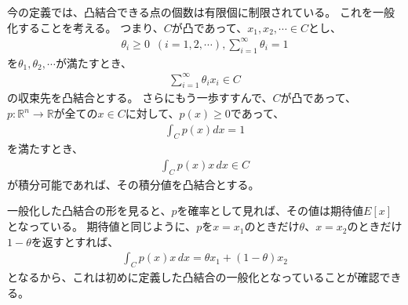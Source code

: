 \documentclass[pdflatex, ja=standard, a4paper]{bxjsarticle}
\begin{document}
今の定義では、凸結合できる点の個数は有限個に制限されている。
これを一般化することを考える。
つまり、$C$が凸であって、$x_1, x_2, \cdots \in C$とし、
\begin{align*}
    \theta_i \geq 0 \enspace (i = 1, 2, \cdots), \sum_{i = 1}^\infty \theta_i = 1
\end{align*}
を$\theta_1, \theta_2, \cdots$が満たすとき、
\begin{align*}
    \sum_{i = 1}^\infty \theta_i x_i \in C
\end{align*}
の収束先を凸結合とする。
さらにもう一歩すすんで、$C$が凸であって、$p: \mathbb{R}^n \to \mathbb{R}$が全ての$x \in C$に対して、$p(x) \geq 0$であって、
\begin{align*}
    \int_C p(x) dx = 1
\end{align*}
を満たすとき、
\begin{align*}
    \int_C p(x) x \, dx \in C
\end{align*}
が積分可能であれば、その積分値を凸結合とする。

一般化した凸結合の形を見ると、$p$を確率として見れば、その値は期待値$E[x]$となっている。
期待値と同じように、$p$を$x = x_1$のときだけ$\theta$、$x = x_2$のときだけ$1 - \theta$を返すとすれば、
\begin{align*}
    \int_C p(x) x \, dx = \theta x_1 + (1 - \theta) x_2
\end{align*}
となるから、これは初めに定義した凸結合の一般化となっていることが確認できる。
\end{document}
